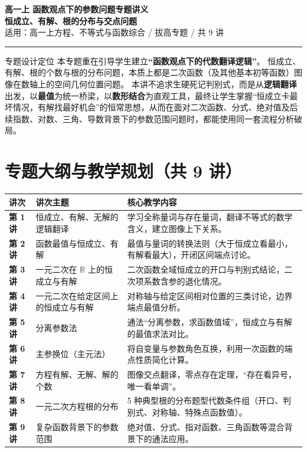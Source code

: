 \documentclass[11pt,a4paper]{ctexart}
\begin{document}
\begin{center}
  {\bfseries 高一上 \quad 函数观点下的参数问题专题讲义}\\[3mm]
  {\Large \bfseries 恒成立、有解、根的分布与交点问题}\\[2mm]
  {\large 适用：高一上方程、不等式与函数综合 / 拔高专题 / 共 9 讲}\\[2mm]
  \rule{0.85\linewidth}{0.5pt}
\end{center}

\begin{teachbox}{专题设计定位}
本专题重在引导学生建立\textbf{“函数观点下的代数翻译逻辑”}。
恒成立、有解、根的个数与根的分布问题，本质上都是二次函数（及其他基本初等函数）图像在数轴上的空间几何位置问题。
本讲不追求生硬死记判别式，而是从\textbf{逻辑翻译}出发，以\textbf{最值}为统一桥梁，以\textbf{数形结合}为直观工具，最终让学生掌握“恒成立卡最坏情况，有解找最好机会”的恒常思想，从而在面对二次函数、分式、绝对值及后续指数、对数、三角、导数背景下的参数范围问题时，都能使用同一套流程分析破局。
\end{teachbox}

\section{专题大纲与教学规划（共 9 讲）}

\begin{center}
\renewcommand{\arraystretch}{1.2}
\begin{tabularx}{0.95\linewidth}{>{\bfseries}p{1.2cm} X X}
\toprule
讲次 & 讲次主题 & 核心教学内容 \\
\midrule
第 1 讲 & 恒成立、有解、无解的逻辑翻译 & 学习全称量词与存在量词，翻译不等式的数学含义，建立图像上下关系。 \\
第 2 讲 & 函数最值与恒成立、有解 & 最值与量词的转换法则（大于恒成立看最小，有解看最大），开闭区间端点讨论。 \\
第 3 讲 & 一元二次在 $\mathbb R$ 上的恒成立与有解 & 二次函数全域恒成立的开口与判别式结论，二次项系数含参的退化情况。 \\
第 4 讲 & 一元二次在给定区间上的恒成立与有解 & 对称轴与给定区间相对位置的三类讨论，边界端点最值分析。 \\
第 5 讲 & 分离参数法 & 通法“分离参数，求函数值域”，恒成立与有解的最值求法对比。 \\
第 6 讲 & 主参换位（主元法） & 将自变量与参数角色互换，利用一次函数的端点性质简化计算。 \\
第 7 讲 & 方程有解、无解、解的个数 & 图像交点翻译，零点存在定理，“存在看异号，唯一看单调”。 \\
第 8 讲 & 一元二次方程根的分布 & 5 种典型根的分布题型代数条件组（开口、判别式、对称轴、特殊点函数值）。 \\
第 9 讲 & 复杂函数背景下的参数范围 & 绝对值、分式、指对函数、三角函数等混合背景下的通法应用。 \\
\bottomrule
\end{tabularx}
\end{center}
\end{document}
